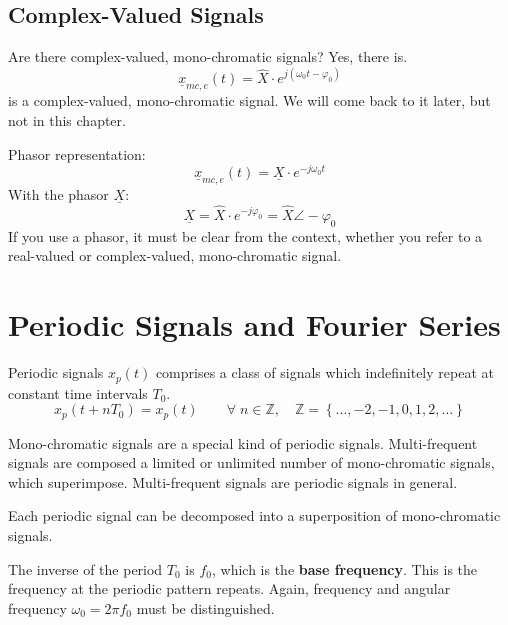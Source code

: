 \begin{refsection}
\subsection{Complex-Valued Signals}

\begin{excursus}{Are there complex-valued, mono-chromatic signals?}
	Yes, there is.
	\begin{equation}
		\underline{x}_{mc,e}(t) = \hat{X} \cdot e^{j \left(\omega_0 t - \varphi_0\right)}
	\end{equation}
	is a complex-valued, mono-chromatic signal. We will come back to it later, but not in this chapter.
	
	\vspace{0.5em}
	Phasor representation:
	\begin{equation}
		\underline{x}_{mc,e}(t) = \underline{X} \cdot e^{- j \omega_0 t}
	\end{equation}
	With the phasor $\underline{X}$:
	\begin{equation}
		\underline{X} = \hat{X} \cdot e^{- j \varphi_0} =  \hat{X} \angle -\varphi_0
	\end{equation}
	If you use a phasor, it must be clear from the context, whether you refer to a real-valued or complex-valued, mono-chromatic signal.
\end{excursus}

\section{Periodic Signals and Fourier Series}

Periodic signals $x_p(t)$ comprises a class of signals which indefinitely repeat at constant time intervals $T_0$.
\begin{equation}
	x_p(t + n T_0) = x_p(t) \qquad \forall \; n \in \mathbb{Z}, \quad \mathbb{Z} = \left\{..., -2, -1, 0, 1, 2, ...\right\}
\end{equation}

Mono-chromatic signals are a special kind of periodic signals. Multi-frequent signals are composed a limited or unlimited number of mono-chromatic signals, which superimpose. Multi-frequent signals are periodic signals in general.

\begin{fact}
	Each periodic signal can be decomposed into a superposition of mono-chromatic signals.
\end{fact}

The inverse of the period $T_0$ is $f_0$, which is the \textbf{base frequency}. This is the frequency at the periodic pattern repeats. Again, frequency and angular frequency $\omega_0 = 2 \pi f_0$ must be distinguished.


\end{refsection}
